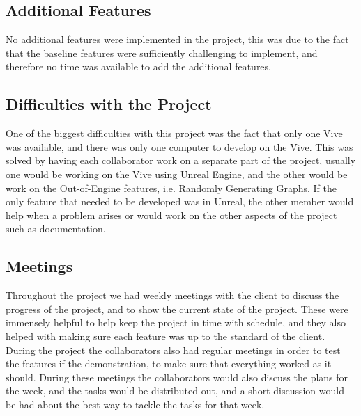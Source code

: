 \subsection{Additional Features}
	No additional features were implemented in the project, this was due to the fact that the baseline features were sufficiently challenging to implement, and therefore no time was available to add the additional features.

\subsection{Difficulties with the Project}
	One of the biggest difficulties with this project was the fact that only one Vive was available, and there was only one computer to develop on the Vive. This was solved by having each collaborator work on a separate part of the project, usually one would be working on the Vive using Unreal Engine, and the other would be work on the Out-of-Engine features, i.e. Randomly Generating Graphs. If the only feature that needed to be developed was in Unreal, the other member would help when a problem arises or would work on the other aspects of the project such as documentation.
	
\subsection{Meetings}
	Throughout the project we had weekly meetings with the client to discuss the progress of the project, and to show the current state of the project. These were immensely helpful to help keep the project in time with schedule, and they also helped with making sure each feature was up to the standard of the client.
	During the project the collaborators also had regular meetings in order to test the features if the demonstration, to make sure that everything worked as it should. During these meetings the collaborators would also discuss the plans for the week, and the tasks would be distributed out, and a short discussion would be had about the best way to tackle the tasks for that week.